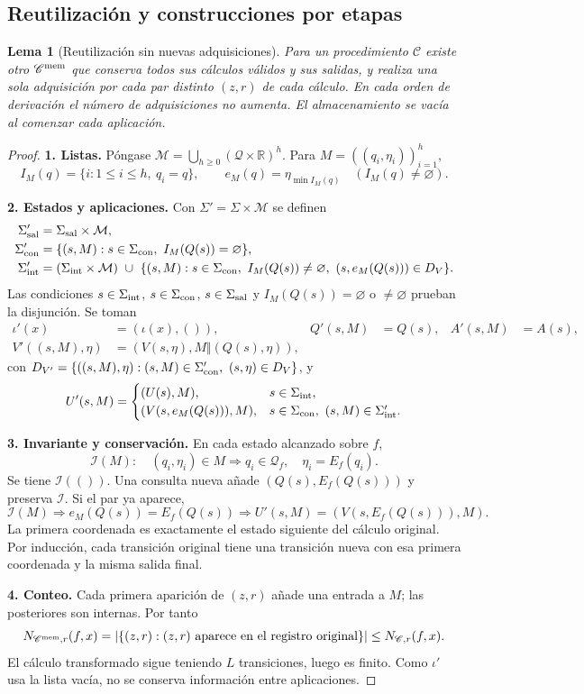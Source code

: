 \documentclass[11pt,a4paper]{article}
\numberwithin{equation}{section}
\newtheorem{lemma}[theorem]{Lema}
\theoremstyle{definition}
\theoremstyle{remark}
\newcommand{\R}{\mathbb R}
\newcommand{\QQ}{\mathcal Q}
\newcommand{\paso}[1]{\par\smallskip\noindent\textbf{#1}\quad}
\begin{document}
\subsection{Reutilización y construcciones por etapas}
\begin{lemma}[Reutilización sin nuevas adquisiciones]\label{lem:cache}
Para un procedimiento $\mathscr C$ existe otro $\mathscr C^{\rm mem}$ que conserva todos sus cálculos válidos y sus salidas, y realiza una sola adquisición por cada par distinto $(z,r)$ de cada cálculo. En cada orden de derivación el número de adquisiciones no aumenta. El almacenamiento se vacía al comenzar cada aplicación.
\end{lemma}
\begin{proof}
\paso{1. Listas.}
Póngase $\mathcal M=\bigcup_{h\ge0}(\QQ\times\R)^h$. Para $M=((q_i,\eta_i))_{i=1}^h$,
\[
I_M(q)=\{i:1\le i\le h,\ q_i=q\},\qquad
 e_M(q)=\eta_{\min I_M(q)}\quad(I_M(q)\ne\varnothing).
\]
\paso{2. Estados y aplicaciones.}
Con $\Sigma'=\Sigma\times\mathcal M$ se definen
\begin{align*}
\Sigma'_{\rm sal}&=\Sigma_{\rm sal}\times\mathcal M,\\
\Sigma'_{\rm con}&=\{(s,M):s\in\Sigma_{\rm con},\ I_M(Q(s))=\varnothing\},\\
\Sigma'_{\rm int}&=(\Sigma_{\rm int}\times\mathcal M)\ \cup\
\{(s,M):s\in\Sigma_{\rm con},\ I_M(Q(s))\ne\varnothing,\ (s,e_M(Q(s)))\in D_V\}.
\end{align*}
Las condiciones $s\in\Sigma_{\rm int}$, $s\in\Sigma_{\rm con}$, $s\in\Sigma_{\rm sal}$ y $I_M(Q(s))=\varnothing$ o $\ne\varnothing$ prueban la disjunción. Se toman
\begin{align*}
\iota'(x)&=(\iota(x),()),& Q'(s,M)&=Q(s),& A'(s,M)&=A(s),\\
V'((s,M),\eta)&=(V(s,\eta),M\Vert(Q(s),\eta)),
\end{align*}
con $D_{V'}=\{((s,M),\eta):(s,M)\in\Sigma'_{\rm con},\ (s,\eta)\in D_V\}$, y
\[
U'(s,M)=\begin{cases}(U(s),M),&s\in\Sigma_{\rm int},\\
(V(s,e_M(Q(s))),M),&s\in\Sigma_{\rm con},\ (s,M)\in\Sigma'_{\rm int}.
\end{cases}
\]
\paso{3. Invariante y conservación.}
En cada estado alcanzado sobre $f$,
\[
\mathcal I(M):\quad(q_i,\eta_i)\in M\Longrightarrow q_i\in\QQ_f,\quad\eta_i=E_f(q_i).
\]
Se tiene $\mathcal I(())$. Una consulta nueva añade $(Q(s),E_f(Q(s)))$ y preserva $\mathcal I$. Si el par ya aparece,
\[
\mathcal I(M)\Longrightarrow e_M(Q(s))=E_f(Q(s))
\Longrightarrow U'(s,M)=(V(s,E_f(Q(s))),M).
\]
La primera coordenada es exactamente el estado siguiente del cálculo original. Por inducción, cada transición original tiene una transición nueva con esa primera coordenada y la misma salida final.
\paso{4. Conteo.}
Cada primera aparición de $(z,r)$ añade una entrada a $M$; las posteriores son internas. Por tanto
\[
N_{\mathscr C^{\rm mem},r}(f,x)
=|\{(z,r): (z,r)\text{ aparece en el registro original}\}|
\le N_{\mathscr C,r}(f,x).
\]
El cálculo transformado sigue teniendo $L$ transiciones, luego es finito. Como $\iota'$ usa la lista vacía, no se conserva información entre aplicaciones.
\end{proof}
\end{document}
